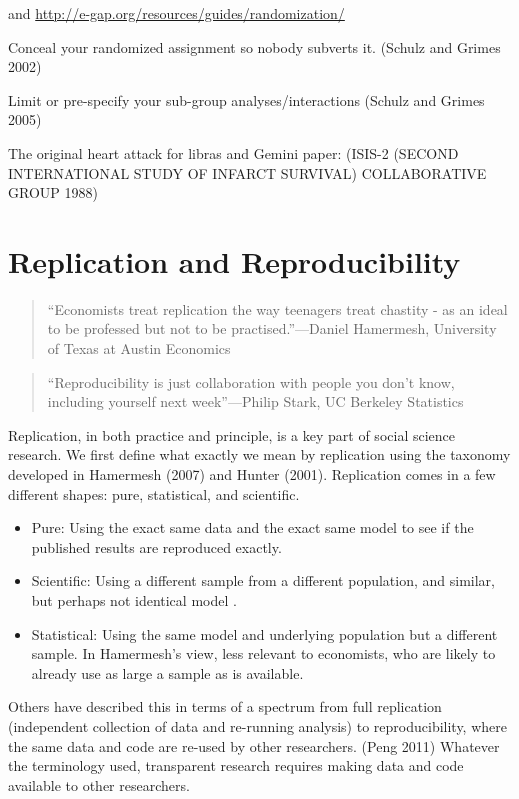 \documentclass[12pt] {article}
\begin{document}
and \url{http://e-gap.org/resources/guides/randomization/}

Conceal your randomized assignment so nobody subverts it. (Schulz and
Grimes 2002)

Limit or pre-specify your sub-group analyses/interactions (Schulz and
Grimes 2005)

The original heart attack for libras and Gemini paper: (ISIS-2 (SECOND
INTERNATIONAL STUDY OF INFARCT SURVIVAL) COLLABORATIVE GROUP 1988)


\section{Replication and
Reproducibility}\label{replication-and-reproducibility}

\begin{quote}
``Economists treat replication the way teenagers treat chastity - as an
ideal to be professed but not to be practised.''---Daniel Hamermesh,
University of Texas at Austin Economics
\end{quote}

\begin{quote}
``Reproducibility is just collaboration with people you don't know,
including yourself next week''---Philip Stark, UC Berkeley Statistics
\end{quote}

Replication, in both practice and principle, is a key part of social
science research. We first define what exactly we mean by replication
using the taxonomy developed in Hamermesh (2007) and Hunter (2001).
Replication comes in a few different shapes: pure, statistical, and
scientific.

\begin{itemize}
\item
  Pure: Using the exact same data and the exact same model to see if the
  published results are reproduced exactly.
\item
  Scientific: Using a different sample from a different population, and
  similar, but perhaps not identical model .
\item
  Statistical: Using the same model and underlying population but a
  different sample. In Hamermesh's view, less relevant to economists,
  who are likely to already use as large a sample as is available.
\end{itemize}

Others have described this in terms of a spectrum from full replication
(independent collection of data and re-running analysis) to
reproducibility, where the same data and code are re-used by other
researchers. (Peng 2011) Whatever the terminology used, transparent
research requires making data and code available to other researchers.
\end{document}
